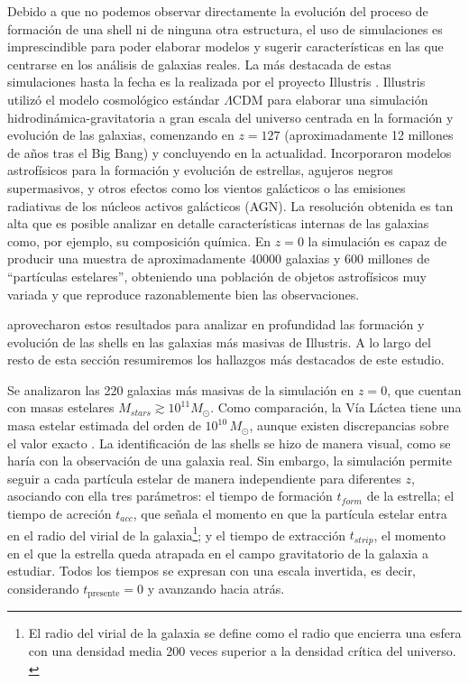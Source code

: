 Debido a que no podemos observar directamente la evolución del proceso de formación de una shell ni de ninguna otra estructura, el uso de simulaciones es imprescindible para poder elaborar modelos y sugerir características en las que centrarse en los análisis de galaxias reales. La más destacada de estas simulaciones hasta la fecha es la realizada por el proyecto Illustris \citep{vogelsbergerPropertiesGalaxiesReproduced2014,vogelsbergerIntroducingIllustrisProject2014}. Illustris utilizó el modelo cosmológico estándar \(\Lambda\)CDM \citep{abdallaCosmologyIntertwinedReview2022} para elaborar una simulación hidrodinámica-gravitatoria a gran escala del universo centrada en la formación y evolución de las galaxias, comenzando en \(z = 127\) (aproximadamente 12 millones de años tras el Big Bang) y concluyendo en la actualidad. Incorporaron modelos astrofísicos para la formación y evolución de estrellas, agujeros negros supermasivos, y otros efectos como los vientos galácticos o las emisiones radiativas de los núcleos activos galácticos (AGN). La resolución obtenida es tan alta que es posible analizar en detalle características internas de las galaxias como, por ejemplo, su composición química. En \(z=0\) la simulación es capaz de producir una muestra de aproximadamente 40000 galaxias y 600 millones de \enquote{partículas estelares}, obteniendo una población de objetos astrofísicos muy variada y que reproduce razonablemente bien las observaciones. \par

\citet{popFormationIncidenceShell2018} aprovecharon estos resultados para analizar en profundidad las formación y evolución de las shells en las galaxias más masivas de Illustris. A lo largo del resto de esta sección resumiremos los hallazgos más destacados de este estudio. \par

Se analizaron las 220 galaxias más masivas de la simulación en \(z = 0\), que cuentan con masas estelares \(M_{stars} \gtrsim 10^{11} M_{\odot}\). Como comparación, la Vía Láctea tiene una masa estelar estimada del orden de \(10^{10} \, M_{\odot}\), aunque existen discrepancias sobre el valor exacto \citep{lianErratumMilkyWay2026, bovyDIRECTDYNAMICALMEASUREMENT2013}. La identificación de las shells se hizo de manera visual, como se haría con la observación de una galaxia real. Sin embargo, la simulación permite seguir a cada partícula estelar de manera independiente para diferentes \(z\), asociando con ella tres parámetros: el tiempo de formación \(t_{form}\) de la estrella; el tiempo de acreción \(t_{acc}\), que señala el momento en que la partícula estelar entra en el radio del virial de la galaxia\footnote{El radio del virial de la galaxia se define como el radio que encierra una esfera con una densidad media 200 veces superior a la densidad crítica del universo. \label{virial}}; y el tiempo de extracción \(t_{strip}\), el momento en el que la estrella queda atrapada en el campo gravitatorio de la galaxia a estudiar. Todos los tiempos se expresan con una escala invertida, es decir, considerando \(t_{\text{presente}} = 0\) y avanzando hacia atrás. \par

